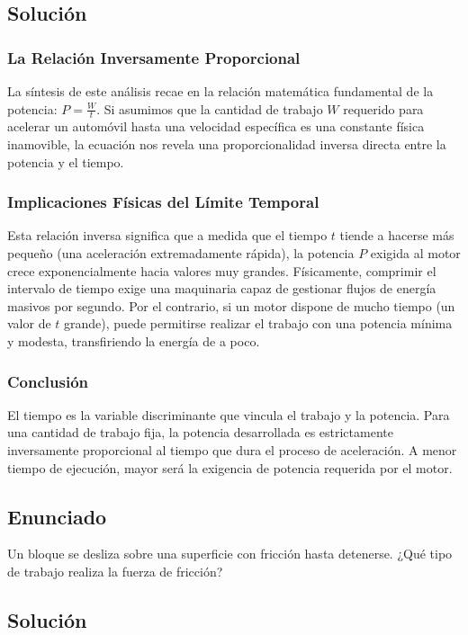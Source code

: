\documentclass[a4paper,12pt]{article}
\begin{document}
\subsection*{Solución}

\subsubsection*{La Relación Inversamente Proporcional}
La síntesis de este análisis recae en la relación matemática fundamental de la potencia: $P = \frac{W}{t}$. Si asumimos que la cantidad de trabajo $W$ requerido para acelerar un automóvil hasta una velocidad específica es una constante física inamovible, la ecuación nos revela una proporcionalidad inversa directa entre la potencia y el tiempo. 

\subsubsection*{Implicaciones Físicas del Límite Temporal}
Esta relación inversa significa que a medida que el tiempo $t$ tiende a hacerse más pequeño (una aceleración extremadamente rápida), la potencia $P$ exigida al motor crece exponencialmente hacia valores muy grandes. Físicamente, comprimir el intervalo de tiempo exige una maquinaria capaz de gestionar flujos de energía masivos por segundo. Por el contrario, si un motor dispone de mucho tiempo (un valor de $t$ grande), puede permitirse realizar el trabajo con una potencia mínima y modesta, transfiriendo la energía de a poco.

\subsubsection*{Conclusión}
El tiempo es la variable discriminante que vincula el trabajo y la potencia. Para una cantidad de trabajo fija, la potencia desarrollada es estrictamente inversamente proporcional al tiempo que dura el proceso de aceleración. A menor tiempo de ejecución, mayor será la exigencia de potencia requerida por el motor.

\newpage

\subsection*{Enunciado}
Un bloque se desliza sobre una superficie con fricción hasta detenerse.
¿Qué tipo de trabajo realiza la fuerza de fricción?

\subsection*{Solución}
\end{document}
